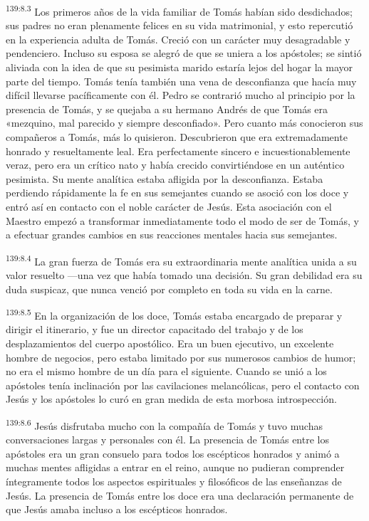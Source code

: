 \par 
\textsuperscript{139:8.3} Los primeros años de la vida familiar de Tomás habían sido desdichados; sus padres no eran plenamente felices en su vida matrimonial, y esto repercutió en la experiencia adulta de Tomás. Creció con un carácter muy desagradable y pendenciero. Incluso su esposa se alegró de que se uniera a los apóstoles; se sintió aliviada con la idea de que su pesimista marido estaría lejos del hogar la mayor parte del tiempo. Tomás tenía también una vena de desconfianza que hacía muy difícil llevarse pacíficamente con él. Pedro se contrarió mucho al principio por la presencia de Tomás, y se quejaba a su hermano Andrés de que Tomás era «mezquino, mal parecido y siempre desconfiado». Pero cuanto más conocieron sus compañeros a Tomás, más lo quisieron. Descubrieron que era extremadamente honrado y resueltamente leal. Era perfectamente sincero e incuestionablemente veraz, pero era un crítico nato y había crecido convirtiéndose en un auténtico pesimista. Su mente analítica estaba afligida por la desconfianza. Estaba perdiendo rápidamente la fe en sus semejantes cuando se asoció con los doce y entró así en contacto con el noble carácter de Jesús. Esta asociación con el Maestro empezó a transformar inmediatamente todo el modo de ser de Tomás, y a efectuar grandes cambios en sus reacciones mentales hacia sus semejantes.

\par 
\textsuperscript{139:8.4} La gran fuerza de Tomás era su extraordinaria mente analítica unida a su valor resuelto ---una vez que había tomado una decisión. Su gran debilidad era su duda suspicaz, que nunca venció por completo en toda su vida en la carne.

\par 
\textsuperscript{139:8.5} En la organización de los doce, Tomás estaba encargado de preparar y dirigir el itinerario, y fue un director capacitado del trabajo y de los desplazamientos del cuerpo apostólico. Era un buen ejecutivo, un excelente hombre de negocios, pero estaba limitado por sus numerosos cambios de humor; no era el mismo hombre de un día para el siguiente. Cuando se unió a los apóstoles tenía inclinación por las cavilaciones melancólicas, pero el contacto con Jesús y los apóstoles lo curó en gran medida de esta morbosa introspección.

\par 
\textsuperscript{139:8.6} Jesús disfrutaba mucho con la compañía de Tomás y tuvo muchas conversaciones largas y personales con él. La presencia de Tomás entre los apóstoles era un gran consuelo para todos los escépticos honrados y animó a muchas mentes afligidas a entrar en el reino, aunque no pudieran comprender íntegramente todos los aspectos espirituales y filosóficos de las enseñanzas de Jesús. La presencia de Tomás entre los doce era una declaración permanente de que Jesús amaba incluso a los escépticos honrados.

